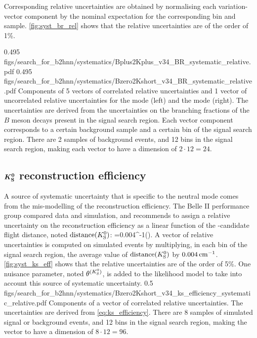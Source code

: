 Corresponding relative uncertainties are obtained by normalising each variation-vector component by the nominal expectation for the corresponding bin and sample.
\cref{fig:syst_br_rel} shows that the relative uncertainties are of the order of 1\%.

{0.495}
{figs/search_for_b2hnn/systematics/Bplus2Kplus_v34_BR_systematic_relative.pdf}
{0.495}
{figs/search_for_b2hnn/systematics/Bzero2Kshort_v34_BR_systematic_relative.pdf}
{
Components of 5 vectors of correlated relative uncertainties and 1 vector of uncorrelated relative uncertainties for the \BKpnn mode (left) and the \BKznn mode (right).
The uncertainties are derived from the uncertainties on the branching fractions of the $B$ meson decays present in the signal search region.
Each vector component corresponds to a certain background sample and a certain bin of the signal search region.
There are 2 samples of background events, and 12 bins in the signal search region, making each vector to have a dimension of $2\cdot12=24$.
\ssrtext
}
\subsection[\KS reconstruction efficiency]{$\boldsymbol{K^0_{\mathrm{S}}}$ reconstruction efficiency} \label{sec:syst_ks_eff}
A source of systematic uncertainty that is specific to the neutral mode \BKznn comes from the mis-modelling of the \KS reconstruction efficiency.
The Belle II performance group compared data and simulation, and recommends to assign a relative uncertainty on the \KS reconstruction efficiency as a linear function of the \KS-candidate flight distance, noted $\mathrm{distance}(K^0_{\mathrm{S}})$:
\be \label{eq:ks_efficiency}
=0.004\cm^{-1}\cdot{}(\KS).
\ee
A vector of relative uncertainties is computed on simulated events by multiplying, in each bin of the signal search region, the average value of $\mathrm{distance}(K^0_{\mathrm{S}})$ by $0.004\mathrm{\,cm}^{-1}$.
\cref{fig:syst_ks_eff} shows that the relative uncertainties are of the order of 5\%.
One nuisance parameter, noted $\theta^{(K^0_{\mathrm{S}})}$, is added to the likelihood model to take into account this source of systematic uncertainty.
{0.5}
{figs/search_for_b2hnn/systematics/Bzero2Kshort_v34_ks_efficiency_systematic_relative.pdf}
{Components of a vector of correlated relative uncertainties.
The uncertainties are derived from \cref{eq:ks_efficiency}.
There are 8 samples of simulated signal or background events, and 12 bins in the signal search region, making the vector to have a dimension of $8\cdot12=96$.
\ssrtext
}
